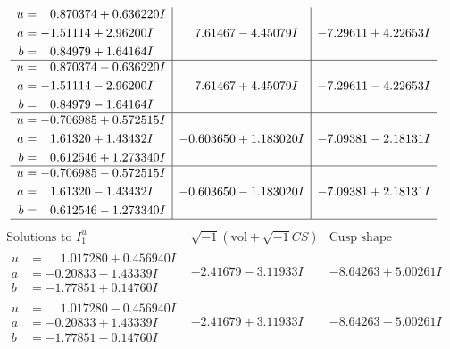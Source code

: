 \documentclass[1p]{elsarticle_modified}
\theoremstyle{definition}
\newcommand{\I}{\sqrt{-1}}
\begin{document}
$$\begin{array}{c|c|c}
\begin{aligned}
u &= \phantom{-}0.870374 + 0.636220 I \\
a &= -1.51114 + 2.96200 I \\
b &= \phantom{-}0.84979 + 1.64164 I\end{aligned}
 & \phantom{-}7.61467 - 4.45079 I & -7.29611 + 4.22653 I \\ \hline\begin{aligned}
u &= \phantom{-}0.870374 - 0.636220 I \\
a &= -1.51114 - 2.96200 I \\
b &= \phantom{-}0.84979 - 1.64164 I\end{aligned}
 & \phantom{-}7.61467 + 4.45079 I & -7.29611 - 4.22653 I \\ \hline\begin{aligned}
u &= -0.706985 + 0.572515 I \\
a &= \phantom{-}1.61320 + 1.43432 I \\
b &= \phantom{-}0.612546 + 1.273340 I\end{aligned}
 & -0.603650 + 1.183020 I & -7.09381 - 2.18131 I \\ \hline\begin{aligned}
u &= -0.706985 - 0.572515 I \\
a &= \phantom{-}1.61320 - 1.43432 I \\
b &= \phantom{-}0.612546 - 1.273340 I\end{aligned}
 & -0.603650 - 1.183020 I & -7.09381 + 2.18131 I\\
 \hline 
 \end{array}$$\newpage$$\begin{array}{c|c|c}  
\text{Solutions to }I^u_{1}& \I (\text{vol} + \sqrt{-1}CS) & \text{Cusp shape}\\
 \hline 
\begin{aligned}
u &= \phantom{-}1.017280 + 0.456940 I \\
a &= -0.20833 - 1.43339 I \\
b &= -1.77851 + 0.14760 I\end{aligned}
 & -2.41679 - 3.11933 I & -8.64263 + 5.00261 I \\ \hline\begin{aligned}
u &= \phantom{-}1.017280 - 0.456940 I \\
a &= -0.20833 + 1.43339 I \\
b &= -1.77851 - 0.14760 I\end{aligned}
 & -2.41679 + 3.11933 I & -8.64263 - 5.00261 I \\ \hline\begin{aligned}

\end{aligned}
\end{array}$$
\end{document}
